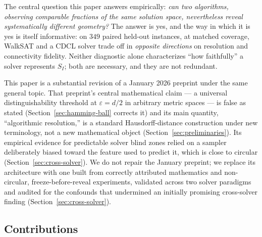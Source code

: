 \documentclass[11pt]{article}
\theoremstyle{definition}
\theoremstyle{remark}
\newcommand{\Shat}{S_I}
\begin{document}
The central question this paper answers empirically: \emph{can two algorithms, observing comparable fractions of the same solution space, nevertheless reveal systematically different geometry?} The answer is yes, and the way in which it is yes is itself informative: on $349$ paired held-out instances, at matched coverage, WalkSAT and a CDCL solver trade off in \emph{opposite directions} on resolution and connectivity fidelity. Neither diagnostic alone characterizes ``how faithfully'' a solver represents $\Shat$; both are necessary, and they are not redundant.

This paper is a substantial revision of a January 2026 preprint under the same general topic. That preprint's central mathematical claim --- a universal distinguishability threshold at $\varepsilon = d/2$ in arbitrary metric spaces --- is false as stated (Section~\ref{sec:hamming-ball} corrects it) and its main quantity, ``algorithmic resolution,'' is a standard Hausdorff-distance construction under new terminology, not a new mathematical object (Section~\ref{sec:preliminaries}). Its empirical evidence for predictable solver blind zones relied on a sampler deliberately biased toward the feature used to predict it, which is close to circular (Section~\ref{sec:cross-solver}). We do not repair the January preprint; we replace its architecture with one built from correctly attributed mathematics and non-circular, freeze-before-reveal experiments, validated across two solver paradigms and audited for the confounds that undermined an initially promising cross-solver finding (Section~\ref{sec:cross-solver}).

\subsection{Contributions}
\end{document}
